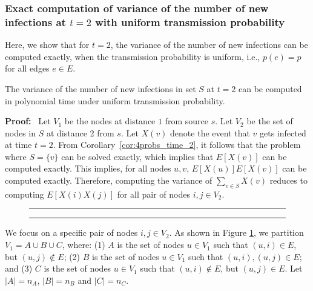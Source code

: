 \subsubsection{Exact computation of variance of the number of new infections
at $t=2$ with uniform transmission probability}
\label{sec:exact-t2}


Here, we show that for $t=2$, the variance of the number of
new infections can be computed exactly,
when the transmission probability is uniform, i.e., $p(e)=p$
for all edges $e\in E$.

\begin{proposition}
The variance of the number of new infections in set $S$ at $t=2$ can be computed in
polynomial time under uniform transmission probability.
\end{proposition}

\noindent
\textbf{Proof:}~
Let $V_1$ be the nodes at distance $1$ from source $s$. Let $V_2$ be the
set of nodes in $S$ at distance 2 from $s$.
Let $X(v)$ denote the event that $v$ gets infected at time $t=2$.
From Corollary~\ref{cor:4probs_time_2}, it follows that the \TwoVuls{}
problem where $S = \{v\}$ can be solved exactly, which implies that $E[X(v)]$ can
be computed exactly. This implies, for all nodes $u, v$, $E[X(u)]E[X(v)]$
can be computed exactly. Therefore, computing the variance of $\sum_{v\in S} X(v)$
reduces to computing $E[X(i)X(j)]$ for all pair of nodes $i, j\in V_2$.


\begin{figure}
\rule{\textwidth}{0.01in}
\begin{center}

\end{center}
\caption{}
\label{fig:vart2}
\rule{\textwidth}{0.01in}
\end{figure}

We focus on a specific pair of nodes $i, j\in V_2$.
As shown in Figure \ref{fig:vart2},
we partition $V_1= A\cup B \cup C$, where: (1) $A$ is the set of nodes $u\in V_1$
such that $(u,i)\in E$, but $(u,j)\not\in E$; (2) $B$ is the set of nodes $u\in V_1$
such that $(u,i), (u,j)\in E$; and (3) $C$ is the set of nodes $u\in V_1$
such that $(u,i)\not\in E$, but $(u,j)\in E$. Let $|A|=n_A$, $|B|=n_B$ and $|C|=n_C$.

